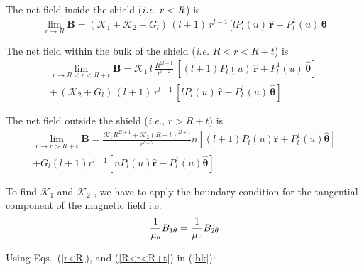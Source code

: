  The net field inside the shield ($\it{i.e.}\;r<R$) is 
\begin{equation}\label{r<R}
\lim_{r\to R}\bm B = (\mathcal{K}_1+\mathcal{K}_2+G_l) \, (l+1)\, r^{l-1} \, [l P_l(u) \, \bm{\hat{r}} -  P_l^1(u)  \, \bm{\hat{\theta}}
\end{equation}

The net field  within the bulk of the shield (\textit{i.e.} $R<r<R+t$)  is 
\begin{multline}\label{R<r<R+t}
\lim_{r\to R<r<R+t}\bm B= \mathcal{K}_1 \, l\, \frac{R^{2l+1}}{r^{l+2}} \,[(l+1) P_l(u) \, \bm{\hat{r}} +  P_l^1(u)  \, \bm{\hat{\theta}} ] \, \\ +\, (\mathcal{K}_2+G_l) \, (l+1)\, r^{l-1} \, [l P_l(u) \, \bm{\hat{r}} -  P_l^1(u)  \, \bm{\hat{\theta}} ]
\end{multline}

The net field  outside the shield (\textit{i.e.}, $r>R+t$) is
\begin{multline}\label{r>R}
\lim_{r\to r>R+t}\bm B=\frac{\mathcal{K}_1R^{2l+1} + \mathcal{K}_2 (R+t)^{2l+1} }{r^{l+2}} n [(l+1) P_l(u) \bm{\hat{r}} +  P_l^1(u)  \bm{\hat{\theta}} ]  \\+ G_l (l+1) r^{l-1} [n P_l(u) \bm{\hat{r}} - P_l^1(u)  \bm{\hat{\theta}} ]
\end{multline}

To find \(\mathcal{K}_1\) and \(\mathcal{K}_2\) , we have to apply the boundary condition for the tangential component of the magnetic field i.e.
\begin{equation}\label{bk}
\frac{1}{\mu_{\scriptscriptstyle 0}} B_{1\theta}=  \frac{1}{\mu_r} B_{2\theta}  
\end{equation}

Using Eqs.~(\ref{r<R}), and (\ref{R<r<R+t}) in (\ref{bk}):




